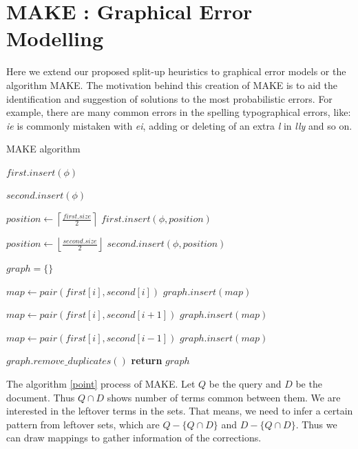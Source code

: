 \chapter{MAKE : Graphical Error Modelling} %
%
\label{ch:graph}	
	
	Here we extend our proposed split-up heuristics to graphical error models or the algorithm MAKE.
	The motivation behind this creation of MAKE is to aid the identification and suggestion of solutions to the most probabilistic errors.
	For example, there are many common errors in the spelling typographical errors, like: \textit{ie} is commonly mistaken with \textit{ei}, adding or deleting of an extra \textit{l} in \textit{lly} and so on.
	
	\begin{algorithm}
		\caption{MAKE algorithm}\label{point}
		\begin{algorithmic}[1]
			
			\State $first.insert(\phi)$
			\EndIf
			
			\State $second.insert(\phi)$
			\EndIf
			
			\State $position \gets \left \lceil{\frac{first.size}{2}}\right \rceil $
			\State $first.insert(\phi, position)$
			\EndWhile
			
			\State $position \gets \left \lfloor{\frac{second.size}{2}}\right \rfloor $
			\State $second.insert(\phi, position)$
			\EndWhile
			
			\State $graph = \lbrace \rbrace$
			
			\State $map\gets pair(first[i], second[i])$
			\State $graph.insert(map)$
			\EndFor
			
			\State $map\gets pair(first[i], second[i + 1])$
			\State $graph.insert(map)$
			\EndFor
			
			\State $map\gets pair(first[i], second[i - 1])$
			\State $graph.insert(map)$
			\EndFor
			
			\State $graph.remove\_duplicates()$
			\State \textbf{return} $graph$
			\EndProcedure
		\end{algorithmic}
	\end{algorithm}
	
	
	The algorithm \ref{point} process of MAKE.
	Let $Q$ be the query and $D$ be the document.
	Thus $Q \cap D$ shows number of terms common between them.
	We are interested in the leftover terms in the sets.
	That means, we need to infer a certain pattern from leftover sets, which are $Q - \lbrace Q \cap D \rbrace$ and $D - \lbrace Q \cap D \rbrace$.
	Thus we can draw mappings to gather information of the corrections.
	
